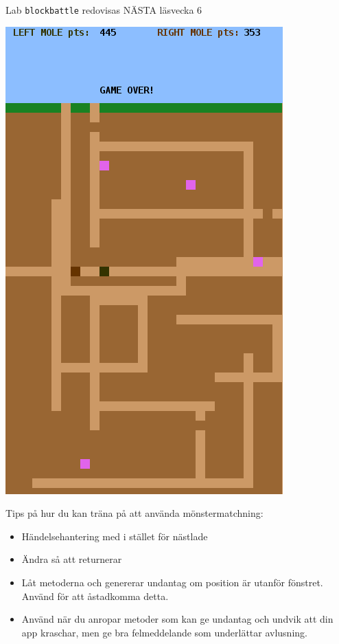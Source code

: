 \begin{SlideExtra}{Lab \texttt{blockbattle} redovisas NÄSTA läsvecka 6}
  \begin{minipage}{0.42\textwidth}
        \includegraphics[height=0.8\textheight]{../img/blockbattle.png}
  \end{minipage}%
  \begin{minipage}{0.59\textwidth}
    \SlideFontSmall Tips på hur du kan träna på att använda mönstermatchning:
    \begin{itemize}\SlideFontSmall
      \item Händelsehantering med  i stället för nästlade 
      \item Ändra så att  returnerar 
      \item Låt metoderna  och  genererar undantag om position är utanför fönstret. Använd  för att åstadkomma detta. 
      \item Använd  när du anropar metoder som kan ge undantag och undvik att din app kraschar, men ge bra felmeddelande som underlättar avlusning.
    \end{itemize}    
  \end{minipage}
\end{SlideExtra}


